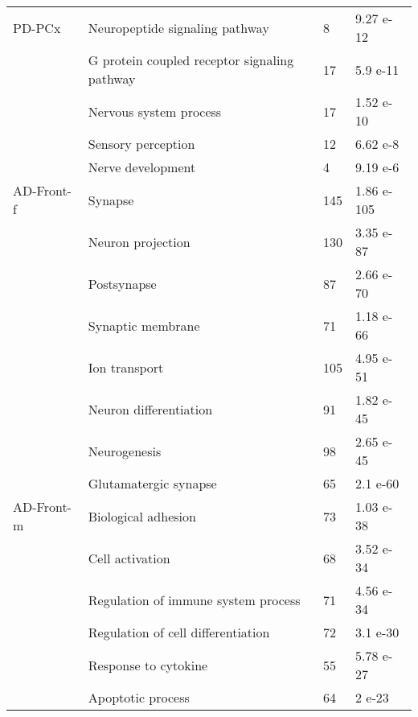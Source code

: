 \begin{table}[!ht]
\begin{tabularx}{13cm}{L{2cm}L{4.5cm}L{3cm}C{1.5cm}}
PD-PCx                           & Neuropeptide signaling pathway               & 8   & 9.27 e-12  \\
                                 & G protein coupled receptor signaling pathway & 17  & 5.9 e-11   \\
                                 & Nervous system process                       & 17  & 1.52 e-10  \\
                                 & Sensory perception                           & 12  & 6.62 e-8   \\
                                 & Nerve development                            & 4   & 9.19 e-6   \\
AD-Front-f                       & Synapse                                        & 145 & 1.86 e-105 \\
                                 & Neuron projection                            & 130 & 3.35 e-87  \\
                                 & Postsynapse                                    & 87  & 2.66 e-70  \\
                                 & Synaptic membrane                            & 71  & 1.18 e-66  \\
                                 & Ion transport                                & 105 & 4.95 e-51  \\
                                 & Neuron differentiation                       & 91  & 1.82 e-45  \\
                                 & Neurogenesis                                   & 98  & 2.65 e-45  \\
                                 & Glutamatergic synapse                        & 65  & 2.1 e-60   \\
AD-Front-m                       & Biological   adhesion                          & 73  & 1.03 e-38  \\
                                 & Cell activation                              & 68  & 3.52 e-34  \\
                                 & Regulation of immune system process          & 71  & 4.56 e-34  \\
                                 & Regulation of cell differentiation           & 72  & 3.1 e-30   \\
                                 & Response to cytokine                         & 55  & 5.78 e-27  \\
                                 & Apoptotic process                            & 64  & 2 e-23     \\ 
\bottomrule
\end{tabularx}
\end{table}


